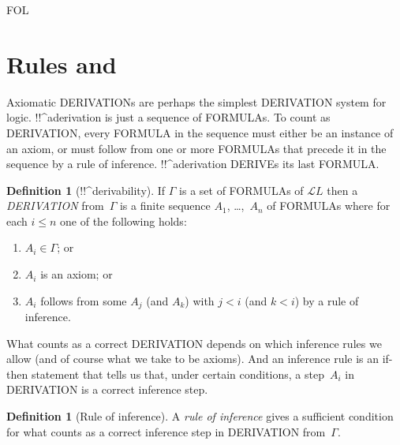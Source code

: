 \documentclass[10pt,a4paper]{article}
\newcommand*{\olup}[1]{\MakeUppercase{#1}}
\theoremstyle{plain}
\theoremstyle{definition}
\newtheorem{defn}[thm]{Definition}
\theoremstyle{remark}
\newenvironment{explain}{}{}
\newcommand*{\olfileid}[3]{}
\newcommand*{\olsection}[1]{\section*{#1}}
\providecommand{\Lang}{\ensuremath{\mathcal{L}}}
\providecommand{\iftag}[1]{#1}
\providecommand{\iftag}{}
\begin{document}



\iftag{FOL}
      {\olfileid{fol}{axd}{rul}}
      {\olfileid{pl}{axd}{rul}}

\olsection{Rules and }

\begin{explain}
  Axiomatic \olup{derivation}s are perhaps the simplest \olup{derivation} system for
  logic. !!^a{derivation} is just a sequence of \olup{formula}s.  To
  count as \olup{derivation}, every \olup{formula} in the sequence must
  either be an instance of an axiom, or must follow from one or more
  \olup{formula}s that precede it in the sequence by a rule of inference.
  !!^a{derivation} \olup{derive}s its last \olup{formula}.
\end{explain}

\begin{defn}[!!^{derivability}]
If $\Gamma$ is a set of \olup{formula}s of $\Lang L$ then a
\emph{\olup{derivation}} from~$\Gamma$ is a finite sequence $A_1$,
\dots,~$A_n$ of \olup{formula}s where for each $i \le n$ one of the
following holds:
\begin{enumerate}
\item $A_i \in \Gamma$; or
\item $A_i$ is an axiom; or
\item $A_i$ follows from some $A_j$ (and $A_k$) with $j < i$ (and
  $k < i$) by a rule of inference.
\end{enumerate}
\end{defn}

What counts as a correct \olup{derivation} depends on which inference
rules we allow (and of course what we take to be axioms).  And an
inference rule is an if-then statement that tells us that, under
certain conditions, a step~$A_i$ in \olup{derivation} is a correct
inference step.

\begin{defn}[Rule of inference]
A \emph{rule of inference} gives a sufficient condition for what
counts as a correct inference step in \olup{derivation} from~$\Gamma$.
\end{defn}
\end{document}
